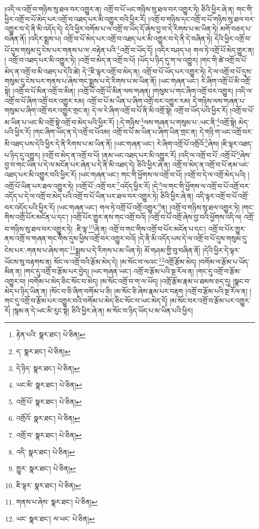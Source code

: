 །འདི་ལ་འགྲོ་བ་གཉིས་སུ་ཐལ་བར་འགྱུར་ན། འགྲོ་བ་པོ་ཡང་གཉིས་སུ་ཐལ་བར་འགྱུར་ཏེ། ཅིའི་ཕྱིར་ཞེ་ན། གང་གི་ཕྱིར་འགྲོ་བ་པོ་མེད་པར་འགྲོ་བ་འཐད་པར་མི་འགྱུར་བའི་ཕྱིར་རོ། །འགྲོ་བ་གཉིས་དང་འགྲོ་བ་པོ་གཉིས་སུ་ཐལ་བར་འགྱུར་བ་དེ་ནི་མི་འདོད་དེ། དེའི་ཕྱིར་བགོམ་པ་ལ་འགྲོ་བ་ཡོད་དོ་ཞེས་བྱ་བ་དེ་རིགས་པ་མ་ཡིན་ཏེ། མགོ་བཅད་པ་བཞིན་ནོ། །འདིར་སྨྲས་པ། འགྲོ་བ་པོ་མེད་པར་འགྲོ་བ་འཐད་པར་མི་འགྱུར་བ་དེ་ནི་དེ་བཞིན་ཏེ། དེའི་ཕྱིར་འགྲོ་བ་པོ་དུས་གསུམ་དུ་ངེས་པར་གནས་པ་ལ་:བརྟེན་པའི་\footnote{རྟེན་པའི་  སྣར་ཐང་།  པེ་ཅིན། }འགྲོ་བ་ཡོད་དོ། །འདིར་བཤད་པ། གལ་ཏེ་འགྲོ་པོ་མེད་གྱུར་ན། །
འགྲོ་བ་འཐད་པར་མི་འགྱུར་ཏེ། །འགྲོ་བ་མེད་ན་འགྲོ་བ་པོ། །ཡོད་པ་ཉིད་དུ་ག་ལ་འགྱུར། །གང་གི་ཚེ་འགྲོ་བ་པོ་མེད་ན་འགྲོ་བ་མི་འཐད་པ་དེའི་ཚེ། དེ་\footnote{ད་  སྣར་ཐང་།  པེ་ཅིན། }ཇི་ལྟར་འགྲོ་བ་མེད་ན། འགྲོ་བ་པོ་ཡོད་པར་འགྱུར་ཏེ། དེ་ལ་འགྲོ་བ་པོ་དུས་གསུམ་དུ་ངེས་པར་གནས་པ་ཞེས་གང་སྨྲས་པ་དེ་རིགས་པ་མ་ཡིན་ནོ། །ཡང་གཞན་ཡང་། རེ་ཞིག་འགྲོ་པོ་མི་འགྲོ་སྟེ། །འགྲོ་བ་པོ་མིན་འགྲོ་བ་མིན། །འགྲོ་པོ་འགྲོ་པོ་མིན་ལས་གཞན། །གསུམ་པ་གང་ཞིག་འགྲོ་བར་འགྱུར། །འདི་ལ་འགྲོ་བ་པོ་ཞིག་འགྲོ་བར་འགྱུར་རམ། འགྲོ་བ་པོ་མ་ཡིན་པ་ཞིག་འགྲོ་བར་འགྱུར་རམ། དེ་གཉིས་ལས་གཞན་པ་གསུམ་པ་ཞིག་འགྲོ་བར་འགྱུར་གྲང་ན། དེ་ལ་རེ་ཞིག་འགྲོ་བ་པོ་ནི་མི་འགྲོ་སྟེ། འགྲོ་བ་ཡོད་པའི་ཕྱིར་རོ། །འགྲོ་བ་པོ་མ་ཡིན་པ་ཡང་མི་འགྲོ་སྟེ་འགྲོ་བ་མེད་པའི་ཕྱིར་རོ། །:དེ་གཉིས་\footnote{དེ་ཉིད་  སྣར་ཐང་།  པེ་ཅིན། }ལས་གཞན་པ་གསུམ་པ་:ཡང་ནི་\footnote{ཡང་མི་  སྣར་ཐང་།  པེ་ཅིན། }འགྲོ་སྟེ། མེད་པའི་ཕྱིར་རོ། །གང་ཞིག་ཡོད་ན་དེ་འགྲོ་བ་པོའམ། འགྲོ་བ་པོ་མ་ཡིན་པ་ཞིག་ཡིན་གྲང་ན། དེ་གཉི་ག་ཡང་འགྲོ་བར་མི་འཐད་པས་དེའི་ཕྱིར་དེ་ནི་རིགས་པ་མ་ཡིན་ནོ། །ཡང་གཞན་ཡང་། རེ་ཞིག་འགྲོ་པོ་འགྲོའོ་\footnote{འགྲོ་པོ་  སྣར་ཐང་།  པེ་ཅིན། }ཞེས། །ཇི་ལྟར་འཐད་པ་ཉིད་དུ་འགྱུར། །འགྲོ་བ་མེད་ན་འགྲོ་བ་པོ། །ནམ་ཡང་འཐད་པར་མི་འགྱུར་རོ། །འདི་ལ་འགྲོ་བ་པོ་:འགྲོ་པོ་\footnote{འགྲོའོ་  སྣར་ཐང་།  པེ་ཅིན། }ཞེས་བྱ་བ་གང་ཡིན་པ་དེ་ལ་མངོན་པར་ཞེན་པ་དེ་ནི་མི་འཐད་དེ། ཅིའི་ཕྱིར་ཞེ་ན། འགྲོ་བ་མེད་ན་འགྲོ་བ་པོ་ནམ་ཡང་འཐད་པར་མི་འགྱུར་བའི་ཕྱིར་རོ། །ཡང་གཞན་ཡང་། གང་གི་ཕྱོགས་ལ་འགྲོ་བ་པོ། །འགྲོ་བ་དེ་ལ་འགྲོ་མེད་པའི། །འགྲོ་པོ་ཡིན་པར་ཐལ་འགྱུར་ཏེ། །འགྲོ་པོ་:འགྲོ་བར་\footnote{འགྲོ་བ་  སྣར་ཐང་།  པེ་ཅིན། }འདོད་ཕྱིར་རོ། །དེ་\footnote{འདི་  སྣར་ཐང་།  པེ་ཅིན། }ལ་གང་གི་ཕྱོགས་ལ་འགྲོ་བ་པོ་འགྲོ་བར་འདོད་པ་དེ་ལ་འགྲོ་བ་མེད་པའི་འགྲོ་བ་པོ་ཡིན་པར་ཐལ་བར་འགྱུར་ཏེ། ཅིའི་ཕྱིར་ཞེ་ན། འདི་ལྟར་འགྲོ་བ་པོ་འགྲོ་བར་འདོད་པའི་ཕྱིར་རོ། །ཡང་གཞན་ཡང་། གལ་ཏེ་འགྲོ་པོ་འགྲོ་འགྱུར་\footnote{གྱུར་  སྣར་ཐང་།  པེ་ཅིན། }ན། །འགྲོ་བ་གཉིས་སུ་ཐལ་འགྱུར་ཏེ། །གང་གིས་འགྲོ་པོར་མངོན་པ་དང་། །འགྲོ་པོར་གྱུར་ནས་གང་འགྲོ་བའོ། །འགྲོ་བ་པོ་འགྲོ་ཞེས་བྱ་བའི་ཕྱོགས་འདི་ལ། འགྲོ་བ་གཉིས་སུ་ཐལ་བར་འགྱུར་ཏེ། :ཇི་ལྟ་\footnote{ཇི་ལྟར་  སྣར་ཐང་།  པེ་ཅིན། }ཞེ་ན། འགྲོ་བ་གང་གིས་འགྲོ་བ་པོར་མངོན་པ་དང་། འགྲོ་བ་པོར་གྱུར་ནས་འགྲོ་བ་གཞན་གང་གིས་དུས་ཕྱིས་འགྲོ་བར་འགྱུར་བའོ། །དེ་ནི་མི་འདོད་པས་དེ་ལ་འགྲོ་བ་པོ་དུས་གསུམ་དུ་ངེས་པར་:གནས་པ་ཞེས་གང་\footnote{གནས་པ་ཞེས་  སྣར་ཐང་།  པེ་ཅིན། }སྨྲས་པ་དེ་རིགས་པ་མ་ཡིན་ཏེ། མོ་གཤམ་གྱི་བུ་བཞིན་ནོ། །དེའི་ཕྱིར་དེ་ལྟར་ཡོངས་སུ་བརྟགས་ན། སོང་ལ་འགྲོ་བའི་རྩོམ་མེད་དེ། །མ་སོང་བ་ལའང་\footnote{ཡང་  སྣར་ཐང་། ལ་ཡང་  པེ་ཅིན། }འགྲོ་རྩོམ་མེད། །བགོམ་ལ་རྩོམ་པ་ཡོད་མིན་ན། །གང་དུ་འགྲོ་བ་རྩོམ་པར་བྱེད། །ཡང་གཞན་ཡང་། འགྲོ་བ་རྩོམ་པའི་སྔ་རོལ་ན། །གང་དུ་འགྲོ་བ་རྩོམ་འགྱུར་བ། །བགོམ་པ་མེད་ཅིང་སོང་བ་མེད། །མ་སོང་འགྲོ་བ་ག་ལ་ཡོད། །འགྲོ་རྩོམ་རྣམ་པ་ཐམས་ཅད་དུ། །སྣང་བ་མེད་པ་ཉིད་ཡིན་ན། །སོང་བ་ཅི་ཞིག་བགོམ་པ་ཅི། །མ་སོང་ཅི་ཞེས་རྣམ་པར་བརྟག །འགྲོ་བ་རྩོམ་པའི་སྔ་རོལ་ན། །གང་དུ་འགྲོ་བ་རྩོམ་པར་འགྱུར་བའི་བགོམ་པ་མེད་ཅིང་སོང་བ་ཡང་མེད་དོ། །མ་སོང་བར་འགྲོ་བ་རྩོམ་པར་འགྱུར་རོ། །སྙམ་ན་དེ་ཡང་མི་རུང་སྟེ། ཅིའི་ཕྱིར་ཞེ་ན། མ་སོང་བ་ཉིད་ཡོད་པ་མ་ཡིན་པའི་ཕྱིར། 